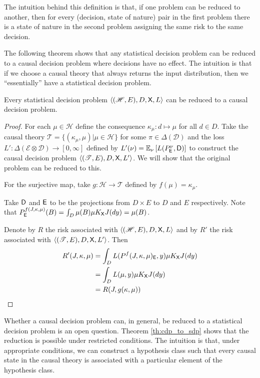 The intuition behind this definition is that, if one problem can be reduced to another, then for every (decision, state of nature) pair in the first problem there is a state of nature in the second problem assigning the same risk to the same decision.

The following theorem shows that any statistical decision problem can be reduced to a causal decision problem where decisions have no effect. The intuition is that if we choose a causal theory that always returns the input distribution, then we ``essentially'' have a statistical decision problem.

\begin{theorem}
Every statistical decision problem $\langle (\mathscr{H},E),D,\mathsf{X},L\rangle$ can be reduced to a causal decision problem.
\end{theorem}
\begin{proof}
For each $\mu\in \mathscr{H}$ define the consequence $\kappa_\mu:d\mapsto \mu$ for all $d\in D$. Take the causal theory $\mathscr{T}=\{(\kappa_\mu,\mu)|\mu\in \mathscr{H}\}$ for some $\pi\in \Delta(\mathcal{D})$ and the loss $L':\Delta(\mathcal{E}\otimes\mathcal{D})\to[0,\infty]$ defined by $L'(\nu) = \mathbb{E}_\nu \left[L(P^\nu_{\mathsf{E}},\mathsf{D})\right]$ to construct the causal decision problem $\langle (\mathscr{T},E),D,\mathsf{X},L'\rangle$. We will show that the original problem can be reduced to this.

For the surjective map, take $g:\mathscr{H}\to \mathscr{T}$ defined by $f(\mu)=\kappa_\mu$.

Take $\mathsf{D}$ and $\mathsf{E}$ to be the projections from $D\times E$ to $D$ and $E$ respectively. Note that $P^{f(J,\kappa,\mu)}_{\mathsf{E}}(B) = \int_D \mu(B) \mu K_{\mathsf{X}} J(dy) = \mu(B)$.

Denote by $R$ the risk associated with $\langle (\mathscr{H},E),D,\mathsf{X},L\rangle$ and by $R'$ the risk associated with $\langle (\mathscr{T},E),D,\mathsf{X},L'\rangle$. Then
\begin{align}
    R'(J,\kappa,\mu) &= \int_D L(P^f(J,\kappa,\mu)_{\mathsf{E}}, y) \mu K_{\mathsf{X}} J(dy)\\
                   &= \int_D L(\mu,y) \mu K_{\mathsf{X}} J(dy)\\
                   &=R(J,g(\kappa,\mu))
\end{align}
\end{proof}

Whether a causal decision problem can, in general, be reduced to a statistical decision problem is an open question. Theorem \ref{th:cdp_to_sdp} shows that the reduction is possible under restricted conditions. The intuition is that, under appropriate conditions, we can construct a hypothesis class such that every causal state in the causal theory is associated with a particular element of the hypothesis class.

